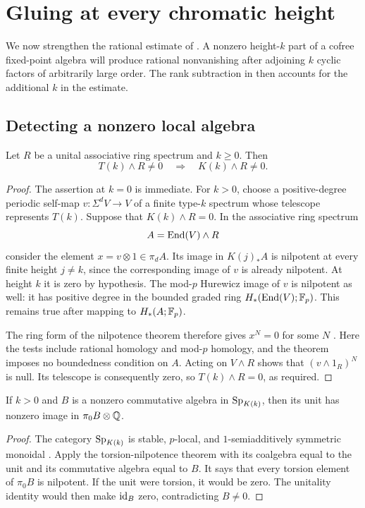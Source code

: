 \section{Gluing at every chromatic height}\label{sec:gluing}

We now strengthen the rational estimate of .
A nonzero height-\(k\) part of a cofree fixed-point algebra will produce
rational nonvanishing after adjoining \(k\) cyclic factors of arbitrarily
large order.  The rank subtraction in  then
accounts for the additional \(k\) in the estimate.

\subsection{Detecting a nonzero local algebra}

\begin{lemma}\label{lem:ring-detection}
Let \(R\) be a unital associative ring spectrum and \(k\ge0\).  Then
\[
 T(k)\wedge R\ne0\quad\Longrightarrow\quad K(k)\wedge R\ne0.
\]
\end{lemma}
\begin{proof}
The assertion at \(k=0\) is immediate.  For \(k>0\), choose a
positive-degree periodic self-map \(v:\Sigma^dV\to V\) of a finite
type-\(k\) spectrum whose telescope represents \(T(k)\).  Suppose that
\(K(k)\wedge R=0\).  In the associative ring spectrum
\[
 A=\operatorname{End}(V)\wedge R
\]
consider the element \(x=v\otimes1\in\pi_dA\).  Its image in
\(K(j)_*A\) is nilpotent at every finite height \(j\ne k\), since the
corresponding image of \(v\) is already nilpotent.  At height \(k\) it is
zero by hypothesis.  The mod-\(p\) Hurewicz image of \(v\) is nilpotent
as well: it has positive degree in the bounded graded ring
\(H_*(\operatorname{End}(V);\mathbb F_p)\).  This remains true after mapping to
\(H_*(A;\mathbb F_p)\).

The ring form of the nilpotence theorem therefore gives \(x^N=0\) for
some \(N\) \cite[Theorem~3(i)]{HS}.  Here the tests include rational
homology and mod-\(p\) homology, and the theorem imposes no boundedness
condition on \(A\).  Acting on \(V\wedge R\) shows that
\((v\wedge1_R)^N\) is null.  Its telescope is consequently zero, so
\(T(k)\wedge R=0\), as required.
\end{proof}

\begin{lemma}\label{lem:rational-unit}
If \(k>0\) and \(B\) is a nonzero commutative algebra in
\(\mathrm{Sp}_{K(k)}\), then its unit has nonzero image in
\(\pi_0B\otimes\mathbb Q\).
\end{lemma}
\begin{proof}
The category \(\mathrm{Sp}_{K(k)}\) is stable, \(p\)-local, and
\(1\)-semiadditively symmetric monoidal
\cite[Corollary~5.3.2]{CSY}.  Apply the torsion-nilpotence theorem
\cite[Theorem~4.3.5]{CSY} with its coalgebra equal to the unit and its
commutative algebra equal to \(B\).  It says that every torsion element
of \(\pi_0B\) is nilpotent.  If the unit were torsion, it would be zero.
The unitality identity would then make \(\mathrm{id}_B\) zero, contradicting
\(B\ne0\).
\end{proof}

